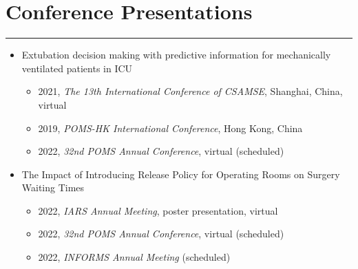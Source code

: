 \documentclass[12pt, a4paper]{article}
\begin{document}
{\begin{enumerate}[leftmargin=36pt, itemsep=6pt, parsep=0.2pt, topsep=1pt]
\end{enumerate}




\section*{Conference Presentations}
\vspace*{0.4em}
\hrule height 0.5pt
\begin{itemize}[leftmargin=36pt, itemsep=6pt, parsep=0.2pt, topsep=1pt]

	\item Extubation decision making with predictive information for mechanically ventilated patients in ICU

	\begin{itemize}[leftmargin=20pt, itemsep=2pt, topsep=2pt]

		\item 2021, {\it The 13th International Conference of CSAMSE}, Shanghai, China, virtual

		\item 2019, {\it POMS-HK International Conference}, Hong Kong, China
		
		\item 2022, {\it 32nd POMS Annual Conference}, virtual (scheduled)

	\end{itemize}

	\item The Impact of Introducing Release Policy for Operating Rooms on Surgery Waiting Times

	\begin{itemize}
		
		\item 2022, {\it IARS Annual Meeting}, poster presentation, virtual

		\item 2022, {\it 32nd POMS Annual Conference}, virtual (scheduled)

		\item 2022, {\it INFORMS Annual Meeting} (scheduled)
	
	\end{itemize}

\end{itemize}



}
\end{document}
